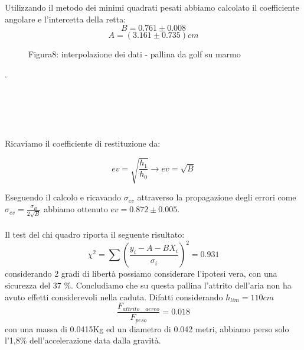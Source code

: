 \documentclass[a4paper]{article}
\theoremstyle{definition}
\begin{document}
	\noindent Utilizzando il metodo dei minimi quadrati pesati  abbiamo calcolato il coefficiente angolare e l'intercetta della retta:\\
	\[B = 0.761 \pm 0.008\]
	\[A = (3.161 \pm 0.735) cm\]
	
	\begin{figure}[!ht]
		\captionsetup{labelformat=empty}
		\caption{Figura8: interpolazione dei dati - pallina da golf su marmo}
	\end{figure}
.\\\\\\\\\\\\
	Ricaviamo il coefficiente di restituzione da:
	
	\[ev = \sqrt{\frac{h_{1}}{h_{0}}} \rightarrow ev = \sqrt{B}\]
	
	\noindent Eseguendo il calcolo e ricavando \(\sigma_{ev}\) attraverso la propagazione degli errori come \(\sigma _{ev} = \frac{\sigma _{B}}{2\sqrt{B}}\) abbiamo ottenuto \(ev = 0.872 \pm 0.005\).\\\\
	\noindent Il test del chi quadro riporta il seguente risultato:\\
	\[\chi ^{2} = \sum \left ( \frac{y_{i}-A-BX_{i}}{\sigma_{i}} \right )^{2} = 0.931\]
	\noindent considerando 2 gradi di libertà possiamo considerare l'ipotesi vera, con una sicurezza del 37 \(\%\). Concludiamo che su questa pallina l'attrito dell'aria non ha avuto effetti considerevoli nella caduta. Difatti considerando \(h_{lim} = 110 cm\) \[\frac{F_{attrito \quad aereo}}{F_{peso}} = 0.018\]
	con una massa di 0.0415Kg ed un diametro di 0.042 metri, abbiamo perso solo l'1,8\(\%\) dell'accelerazione data dalla gravità.
\end{document}
